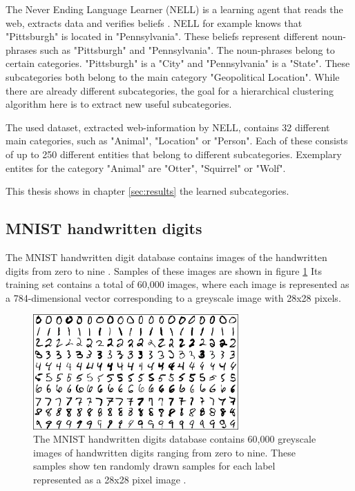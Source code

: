 The Never Ending Language Learner (NELL) is a learning agent that reads the web, extracts data and verifies beliefs \cite{Mitchell:2015:NL:2886521.2886641}\cite{Mitchell:2018:NL:3210350.3191513}. NELL for example knows that "Pittsburgh" is located in "Pennsylvania". These beliefs represent different noun-phrases such as "Pittsburgh" and "Pennsylvania". The noun-phrases belong to certain categories. "Pittsburgh" is a "City" and "Pennsylvania" is a "State". These subcategories both belong to the main category "Geopolitical Location". While there are already different subcategories, the goal for a hierarchical clustering algorithm here is to extract new useful subcategories.

The used dataset, extracted web-information by NELL, contains 32 different main categories, such as "Animal", "Location" or "Person". Each of these consists of up to 250 different entities that belong to different subcategories. Exemplary entites for the category "Animal" are "Otter", "Squirrel" or "Wolf". 

This thesis shows in chapter \ref{sec:results} the learned subcategories.

\subsection{MNIST handwritten digits}

The MNIST handwritten digit database contains images of the handwritten digits from zero to nine \cite{lecun-mnisthandwrittendigit-2010}. Samples of these images are shown in figure \ref{fig:mnist} Its training set contains a total of 60,000 images, where each image is represented as a 784-dimensional vector corresponding to a greyscale image with 28x28 pixels.

\begin{figure}[h]
    \centering
    \includegraphics[width=0.7\textwidth]{images/mnist}
    \caption{The MNIST handwritten digits database contains 60,000 greyscale images of handwritten digits ranging from zero to nine. These samples show ten randomly drawn samples for each label represented as a 28x28 pixel image \cite{lecun-mnisthandwrittendigit-2010}.}
    \label{fig:mnist}
\end{figure}

